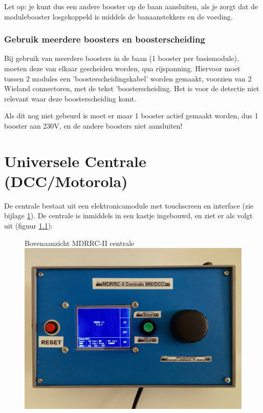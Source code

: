 \documentclass[12pt,a4paper]{report}
\begin{document}
Let op: je kunt dus een andere booster op de baan aansluiten, als je zorgt dat de modulebooster losgekoppeld is middels de banaanstekkers en de voeding.

\subsection{Gebruik meerdere boosters en boosterscheiding}
Bij gebruik van meerdere boosters in de baan (1 booster per basismodule), moeten deze van elkaar gescheiden worden, qua rijspanning. Hiervoor moet tussen 2 modules een 'boosterscheidingskabel' worden gemaakt, voorzien van 2 Wieland connectoren, met de tekst 'boosterscheiding. Het is voor de detectie niet relevant waar deze boosterscheiding komt.

Als dit nog niet gebeurd is moet er maar 1 booster actief gemaakt worden, dus 1 booster aan 230V, en  de andere boosters niet aansluiten!

\chapter{Universele Centrale (DCC/Motorola)}
\label{ch:centrale}
De centrale bestaat uit een elektronicamodule met touchscreen en interface (zie bijlage \ref{ch:centrale}). De centrale is inmiddels in een kastje ingebouwd, en ziet er als volgt uit (figuur \ref{centrale}):
\\

\begin{figure}[ht]
  \captionbox
  {Bovenaanzicht MDRRC-II centrale\label{centrale}}
  {\includegraphics[scale=0.1]{images/rcu_foto1}}\\
\end{figure}
\end{document}
